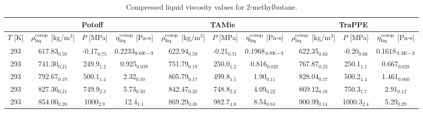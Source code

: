 \documentclass[preprint,review,12pt]{elsarticle}
\begin{document}
\begin{landscape}
	\begin{table}[H]
		\caption{Compressed liquid viscosity values for 2-methylbutane.}
		\begin{center}
			\begin{tabular}{|c|c|c|c|c|c|c|c|c|c|}
				\hline
				& \multicolumn{3}{c|}{Potoff}                                                                          & \multicolumn{3}{c|}{TAMie}                                                                              & \multicolumn{3}{c|}{TraPPE}                                                                          \\ \hline
				$T$ {[}K{]} & $\rho^{\rm comp}_{\rm liq}$ {[}kg/m$^3${]} & $P$ {[}MPa{]}  & $\eta^{\rm comp}_{\rm liq}$ {[}Pa-s{]} & $\rho^{\rm comp}_{\rm liq}$ {[}kg/m$^3${]} & $P$ {[}MPa{]}     & $\eta^{\rm comp}_{\rm liq}$ {[}Pa-s{]} & $\rho^{\rm comp}_{\rm liq}$ {[}kg/m$^3${]} & $P$ {[}MPa{]}  & $\eta^{\rm comp}_{\rm liq}$ {[}Pa-s{]} \\ \hline
				293         & 617.83$_{0.58}$                            & -0.17$_{0.75}$ & 0.2233$_{9.6 \rm E-3}$                      & 622.94$_{0.59}$                         & -0.21$_{0.71}$ & 0.1968$_{4.0 \rm E-3}$                      & 622.35$_{0.83}$                         & -0.20$_{0.66}$ & 0.1618$_{3.3 \rm E-3}$                      \\ \hline
				293         & 741.30$_{0.21}$                            & 249.9$_{1.2}$  & 0.925$_{0.039}$                        & 751.79$_{0.19}$                         & 250.0$_{1.2}$  & 0.816$_{0.028}$                        & 767.87$_{0.23}$                         & 250.1$_{1.1}$  & 0.667$_{0.028}$                        \\ \hline
				293         & 792.67$_{0.19}$                            & 500.1$_{1.4}$  & 2.32$_{0.10}$                          & 805.79$_{0.17}$                         & 499.8$_{1.5}$  & 1.90$_{0.11}$                          & 828.04$_{0.17}$                         & 500.2$_{1.4}$  & 1.461$_{0.060}$                        \\ \hline
				293         & 827.36$_{0.21}$                            & 749.9$_{2.3}$  & 5.73$_{0.50}$                          & 842.47$_{0.20}$                         & 748.8$_{2.2}$  & 4.09$_{0.22}$                          & 869.12$_{0.18}$                         & 750.3$_{1.7}$  & 2.91$_{0.12}$                          \\ \hline
				293         & 854.00$_{0.20}$                            & 1000$_{2.9}$   & 12.4$_{1.1}$                           & 869.29$_{0.38}$                         & 982.7$_{4.0}$  & 8.54$_{0.84}$                          & 900.99$_{0.14}$                         & 1000.3$_{2.4}$ & 5.29$_{0.29}$                          \\ \hline
			\end{tabular}
		\end{center}
	\end{table}


\end{landscape}
\end{document}
